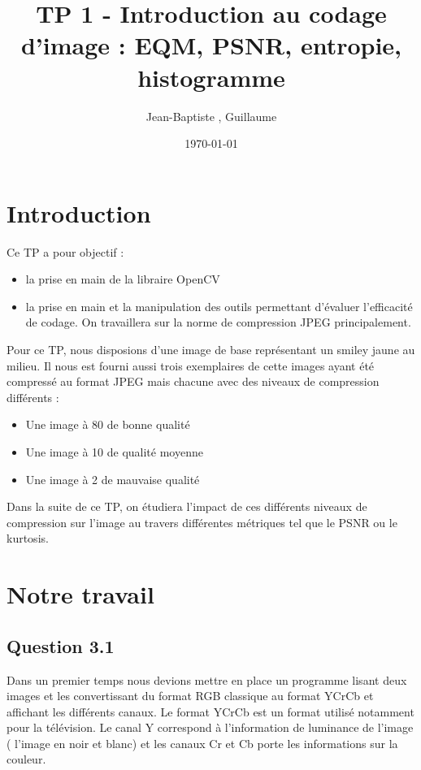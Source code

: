 \documentclass[12pt]{report}
\title{TP 1 - Introduction au codage d'image : EQM, PSNR, entropie, histogramme}
\author{Jean-Baptiste \bsc{Morice}, Guillaume \bsc{Versal}}
\date{\today}
\begin{document}
\maketitle

\tableofcontents

\newpage
\section*{Introduction}

Ce TP a pour objectif :
\begin{itemize}
\item la prise en main de la libraire OpenCV
\item la prise en main et la manipulation des outils permettant d'évaluer l'efficacité de codage. On travaillera sur la norme de compression JPEG principalement.\\
\end{itemize}
Pour ce TP, nous disposions d'une image de base représentant un smiley jaune au milieu. Il nous est fourni aussi trois exemplaires de cette images ayant été compressé au format JPEG mais chacune avec des niveaux de compression différents : 
\begin{itemize}
\item Une image à 80 de bonne qualité
\item Une image à 10  de qualité moyenne
\item Une image à 2 de mauvaise qualité\\
\end{itemize}
Dans la suite de ce TP, on étudiera l'impact de ces différents niveaux de compression sur l'image au travers différentes métriques tel que le PSNR ou le kurtosis.


\newpage
\section{Notre travail}

\subsection{Question 3.1}

Dans un premier temps nous devions mettre en place un programme lisant deux images et les convertissant du format RGB classique au format YCrCb et affichant les différents canaux. Le format YCrCb est un format utilisé notamment pour la télévision. Le canal Y correspond à l'information de luminance de l'image ( l'image en noir et blanc) et les canaux Cr et Cb porte les informations sur la couleur. 
\end{document}
